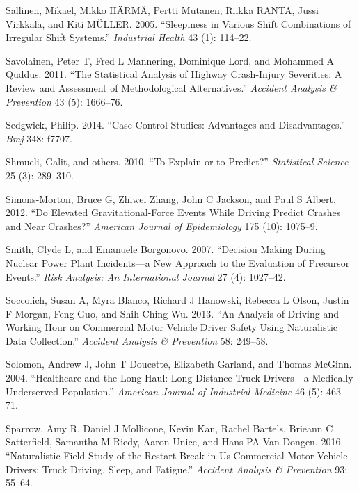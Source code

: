 \documentclass[12pt]{book}
\numberwithin{equation}{chapter}
\begin{document}
\leavevmode\hypertarget{ref-sallinen2005sleepiness}{}%
Sallinen, Mikael, Mikko HÄRMÄ, Pertti Mutanen, Riikka RANTA, Jussi Virkkala, and Kiti MÜLLER. 2005. ``Sleepiness in Various Shift Combinations of Irregular Shift Systems.'' \emph{Industrial Health} 43 (1): 114--22.

\leavevmode\hypertarget{ref-savolainen2011statistical}{}%
Savolainen, Peter T, Fred L Mannering, Dominique Lord, and Mohammed A Quddus. 2011. ``The Statistical Analysis of Highway Crash-Injury Severities: A Review and Assessment of Methodological Alternatives.'' \emph{Accident Analysis \& Prevention} 43 (5): 1666--76.

\leavevmode\hypertarget{ref-sedgwick2014case}{}%
Sedgwick, Philip. 2014. ``Case-Control Studies: Advantages and Disadvantages.'' \emph{Bmj} 348: f7707.

\leavevmode\hypertarget{ref-shmueli2010explain}{}%
Shmueli, Galit, and others. 2010. ``To Explain or to Predict?'' \emph{Statistical Science} 25 (3): 289--310.

\leavevmode\hypertarget{ref-simons2012elevated}{}%
Simons-Morton, Bruce G, Zhiwei Zhang, John C Jackson, and Paul S Albert. 2012. ``Do Elevated Gravitational-Force Events While Driving Predict Crashes and Near Crashes?'' \emph{American Journal of Epidemiology} 175 (10): 1075--9.

\leavevmode\hypertarget{ref-smith2007decision}{}%
Smith, Clyde L, and Emanuele Borgonovo. 2007. ``Decision Making During Nuclear Power Plant Incidents---a New Approach to the Evaluation of Precursor Events.'' \emph{Risk Analysis: An International Journal} 27 (4): 1027--42.

\leavevmode\hypertarget{ref-soccolich2013analysis}{}%
Soccolich, Susan A, Myra Blanco, Richard J Hanowski, Rebecca L Olson, Justin F Morgan, Feng Guo, and Shih-Ching Wu. 2013. ``An Analysis of Driving and Working Hour on Commercial Motor Vehicle Driver Safety Using Naturalistic Data Collection.'' \emph{Accident Analysis \& Prevention} 58: 249--58.

\leavevmode\hypertarget{ref-solomon2004healthcare}{}%
Solomon, Andrew J, John T Doucette, Elizabeth Garland, and Thomas McGinn. 2004. ``Healthcare and the Long Haul: Long Distance Truck Drivers---a Medically Underserved Population.'' \emph{American Journal of Industrial Medicine} 46 (5): 463--71.

\leavevmode\hypertarget{ref-sparrow2016naturalistic}{}%
Sparrow, Amy R, Daniel J Mollicone, Kevin Kan, Rachel Bartels, Brieann C Satterfield, Samantha M Riedy, Aaron Unice, and Hans PA Van Dongen. 2016. ``Naturalistic Field Study of the Restart Break in Us Commercial Motor Vehicle Drivers: Truck Driving, Sleep, and Fatigue.'' \emph{Accident Analysis \& Prevention} 93: 55--64.
\end{document}
